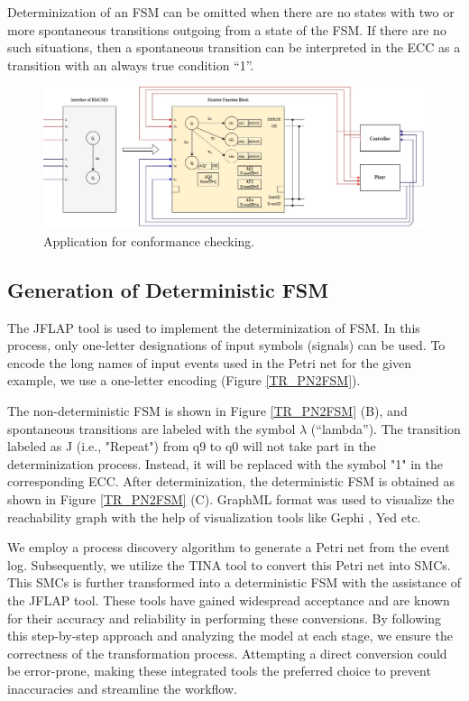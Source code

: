 \begin{bibunit}
Determinization of an FSM can be omitted when there are no states with two or more spontaneous transitions outgoing from a state of the FSM. If there are no such situations, then a spontaneous transition can be interpreted in the ECC as a transition with an always true condition “1”.


\begin{figure}[!t]
	\centering
	\includegraphics[width=1\textwidth]{MX_Papers/Paper7/images/ConformaceCheckingApp.jpg}
	\caption{Application for conformance checking.}
	\label{conformanceCheckingApp}

\end{figure}


\subsection{Generation of Deterministic FSM }



The JFLAP tool \cite{rodger2015jflap} is used to implement the determinization of FSM. In this process, only one-letter designations of input symbols (signals) can be used. To encode the long names of input events used in the Petri net for the given example, we use a one-letter encoding (Figure \ref{TR_PN2FSM}).


The non-deterministic FSM  is shown in Figure \ref{TR_PN2FSM} (B), and spontaneous transitions are labeled with the symbol $\lambda$ (“lambda”). The transition labeled as J (i.e., "Repeat") from q9 to q0 will not take part in the determinization process. Instead, it will be replaced with the symbol "1" in the corresponding ECC. After determinization, the deterministic FSM is obtained as shown in Figure \ref{TR_PN2FSM} (C). GraphML format \cite{GraphMLSpec} was used to visualize the reachability graph with the  help of visualization tools like Gephi \cite{bastian2009gephi}, Yed \cite{yworks} etc. 

We employ a process discovery algorithm to generate a Petri net from the event log. Subsequently, we utilize the TINA tool to convert this Petri net into SMCs. This SMCs is further transformed into a deterministic FSM with the assistance of the JFLAP tool. These tools have gained widespread acceptance and are known for their accuracy and reliability in performing these conversions. By following this step-by-step approach and analyzing the model at each stage, we ensure the correctness of the transformation process. Attempting a direct conversion could be error-prone, making these integrated tools the preferred choice to prevent inaccuracies and streamline the workflow.





\end{bibunit}
